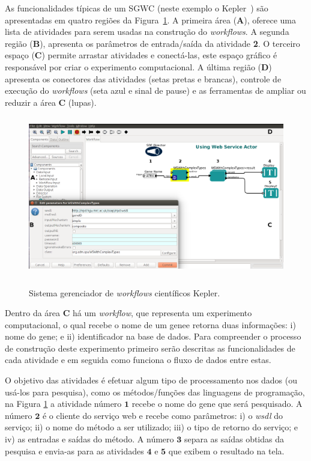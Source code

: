 As funcionalidades típicas de um SGWC (neste exemplo o Kepler~\cite{kepler2014}) são apresentadas em quatro regiões da Figura~\ref{figura_SGWC_Kepler_exemplo_de_workflow}. A primeira área (\textbf{A}), oferece uma lista de atividades para serem usadas na construção do \emph{workf\mbox{}lows}. A segunda região (\textbf{B}), apresenta os parâmetros de entrada/saída da atividade \textbf{2}. O terceiro espaço (\textbf{C}) permite arrastar atividades e conectá-las, este espaço gráfico é responsável por criar o experimento computacional. A última região (\textbf{D}) apresenta os conectores das atividades (setas pretas e brancas), controle de execução do \emph{workflows} (seta azul e sinal de pause) e as ferramentas de ampliar ou reduzir a área \textbf{C} (lupas).
\begin{figure}[!htb]
    \centering  
    \caption[Sistema gerenciador de \emph{workf\mbox{}low} científ\mbox{}ico Kepler]{Sistema gerenciador de \emph{workf\mbox{}lows} científ\mbox{}icos Kepler.}
    \includegraphics[width=13cm,height=7cm]{./secoes/conceitosFundamentais/pics/img/webService.png}    
	\label{figura_SGWC_Kepler_exemplo_de_workflow}
\end{figure}

Dentro da área \textbf{C} há um \emph{workf\mbox{}low}, que representa um experimento computacional, o qual recebe o nome de um genee retorna duas informações: i) nome do gene; e ii) identificador na base de dados. Para compreender o processo de construção deste experimento primeiro serão descritas as funcionalidades de cada atividade e em seguida como funciona o fluxo de dados entre estas.

O objetivo das atividades é efetuar algum tipo de processamento nos dados (ou usá-los para pesquisa), como os métodos/funções das linguagens de programação, na Figura \ref{figura_SGWC_Kepler_exemplo_de_workflow} a atividade número \(\mathbf{1}\) recebe o nome do gene que será pesquisado. A número \(\mathbf{2}\) é o cliente do serviço web e recebe como parâmetros: i) o \emph{wsdl} do serviço; ii) o nome do método a ser utilizado; iii) o tipo de retorno do serviço; e iv) as entradas e saídas do método. A número \(\mathbf{3}\) separa as saídas obtidas da pesquisa e envia-as para as atividades \(\mathbf{4}\) e \(\mathbf{5}\) que exibem o resultado na tela.

